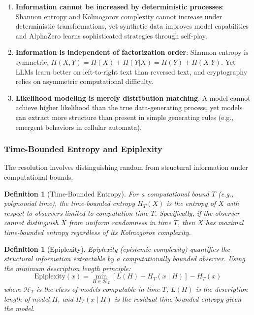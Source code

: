 \documentclass[11pt]{article}
\newtheorem{definition}[theorem]{Definition}
\begin{document}
\begin{enumerate}
    \item \textbf{Information cannot be increased by deterministic processes}: Shannon entropy and Kolmogorov complexity cannot increase under deterministic transformations, yet synthetic data improves model capabilities and AlphaZero learns sophisticated strategies through self-play.

    \item \textbf{Information is independent of factorization order}: Shannon entropy is symmetric: $H(X,Y) = H(X) + H(Y|X) = H(Y) + H(X|Y)$. Yet LLMs learn better on left-to-right text than reversed text, and cryptography relies on asymmetric computational difficulty.

    \item \textbf{Likelihood modeling is merely distribution matching}: A model cannot achieve higher likelihood than the true data-generating process, yet models can extract more structure than present in simple generating rules (e.g., emergent behaviors in cellular automata).
\end{enumerate}

\subsubsection{Time-Bounded Entropy and Epiplexity}

The resolution involves distinguishing random from structural information under computational bounds.

\begin{definition}[Time-Bounded Entropy]
For a computational bound $T$ (e.g., polynomial time), the time-bounded entropy $H_T(X)$ is the entropy of $X$ with respect to observers limited to computation time $T$. Specifically, if the observer cannot distinguish $X$ from uniform randomness in time $T$, then $X$ has maximal time-bounded entropy regardless of its Kolmogorov complexity.
\end{definition}

\begin{definition}[Epiplexity]
Epiplexity (epistemic complexity) quantifies the structural information extractable by a computationally bounded observer. Using the minimum description length principle:
\begin{equation}
\text{Epiplexity}(x) = \min_{H \in \mathcal{H}_T} \left[L(H) + H_T(x \mid H)\right] - H_T(x)
\end{equation}
where $\mathcal{H}_T$ is the class of models computable in time $T$, $L(H)$ is the description length of model $H$, and $H_T(x \mid H)$ is the residual time-bounded entropy given the model.
\end{definition}
\end{document}
